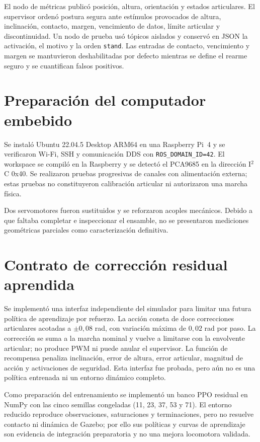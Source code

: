 El nodo de métricas publicó posición, altura, orientación y estados articulares.
El supervisor ordenó postura segura ante estímulos provocados de altura,
inclinación, contacto, margen, vencimiento de datos, límite articular y
discontinuidad. Un nodo de prueba usó tópicos aislados y conservó en JSON la
activación, el motivo y la orden \texttt{stand}. Las entradas de contacto,
vencimiento y margen se mantuvieron deshabilitadas por defecto mientras se
define el rearme seguro y se cuantifican falsos positivos.

\section{Preparación del computador embebido}

Se instaló Ubuntu 22.04.5 Desktop ARM64 en una Raspberry Pi~4 y se verificaron
Wi-Fi, SSH y comunicación DDS con \texttt{ROS\_DOMAIN\_ID=42}. El workspace se
compiló en la Raspberry y se detectó el PCA9685 en la dirección I$^2$C 0x40. Se
realizaron pruebas progresivas de canales con alimentación externa; estas
pruebas no constituyeron calibración articular ni autorizaron una marcha
física.

Dos servomotores fueron sustituidos y se reforzaron acoples mecánicos. Debido a
que faltaba completar e inspeccionar el ensamble, no se presentaron mediciones
geométricas parciales como caracterización definitiva.

\section{Contrato de corrección residual aprendida}
\label{sec:contrato-residual}

Se implementó una interfaz independiente del simulador para limitar una futura
política de aprendizaje por refuerzo. La acción consta de doce correcciones
articulares acotadas a $\pm0{,}08$ rad, con variación máxima de $0{,}02$ rad por
paso. La corrección se suma a la marcha nominal y vuelve a limitarse con la
envolvente articular; no produce PWM ni puede anular el supervisor. La función
de recompensa penaliza inclinación, error de altura, error articular, magnitud
de acción y activaciones de seguridad. Esta interfaz fue probada, pero aún no
es una política entrenada ni un entorno dinámico completo.

Como preparación del entrenamiento se implementó un banco PPO residual en
NumPy con las cinco semillas congeladas (11, 23, 37, 53 y 71). El entorno
reducido reproduce observaciones, saturaciones y terminaciones, pero no resuelve
contacto ni dinámica de Gazebo; por ello sus políticas y curvas de aprendizaje
son evidencia de integración preparatoria y no una mejora locomotora validada.

